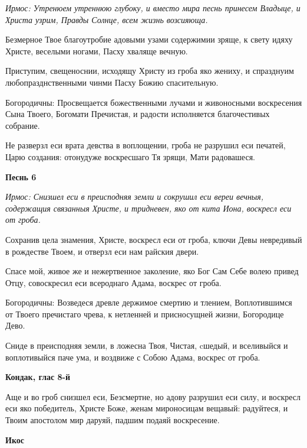 \normalfont{}\itshape Ирмос\normalfont{}: Утренюем утреннюю глубоку, и вместо мира песнь принесем Владыце, и Христа узрим, Правды Солнце, всем жизнь возсияюща. 



Безмерное Твое благоутробие адовыми узами содержимии зряще, к свету идяху Христе, веселыми ногами, Пасху хваляще вечную. 



Приступим, свещеноснии, исходящу Христу из гроба яко жениху, и спразднуим любопразднственными чинми Пасху Божию спасительную. \itshape 

Богородичны\normalfont{}: Просвещается божественными лучами и живоносными воскресения Сына Твоего, Богомати Пречистая, и радости исполняется благочестивых собрание. 



Не разверзл еси врата девства в воплощении, гроба не разрушил еси печатей, Царю создания: отонудуже воскресшаго Тя зрящи, Мати радовашеся. 

\medskip\bfseries Песнь 6 

\normalfont{}\itshape Ирмос\normalfont{}: Снизшел еси в преисподняя земли и сокрушил еси вереи вечныя, содержащия связанныя Христе, и тридневен, яко от кита Иона, воскресл еси от гроба. 



Сохранив цела знамения, Христе, воскресл еси от гроба, ключи Девы невредивый в рождестве Твоем, и отверзл еси нам райския двери. 



Спасе мой, живое же и нежертвенное заколение, яко Бог Сам Себе волею привед Отцу, совоскресил еси всероднаго Адама, воскрес от гроба. \itshape 

Богородичны\normalfont{}: Возведеся древле держимое смертию и тлением, Воплотившимся от Твоего пречистаго чрева, к нетленней и присносущней жизни, Богородице Дево. 



Сниде в преисподняя земли, в ложесна Твоя, Чистая, cшедый, и вселивыйся и воплотивыйся паче ума, и воздвиже с Собою Адама, воскрес от гроба. 

\medskip\bfseries Кондак, глас 8-й

\normalfont{}Аще и во гроб снизшел еси, Безсмертне, но адову разрушил еси силу, и воскресл еси яко победитель, Христе Боже, женам мироносицам вещавый: радуйтеся, и Твоим апостолом мир даруяй, падшим подаяй воскресение. 

\medskip\bfseries Икос

